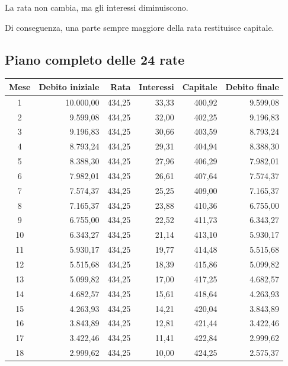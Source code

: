 \noindent La rata non cambia,
ma gli interessi diminuiscono.

\noindent Di conseguenza,
una parte sempre maggiore della rata
restituisce capitale.


\subsection*{Piano completo delle 24 rate}

\begin{center}
    \scriptsize
    \begin{tabular}{|c|r|r|r|r|r|}
        \hline
        \textbf{Mese}
        & \textbf{Debito iniziale}
        & \textbf{Rata}
        & \textbf{Interessi}
        & \textbf{Capitale}
        & \textbf{Debito finale} \\
        \hline
        1 & 10.000,00 & 434,25 & 33,33 & 400,92 & 9.599,08 \\
        2 & 9.599,08 & 434,25 & 32,00 & 402,25 & 9.196,83 \\
        3 & 9.196,83 & 434,25 & 30,66 & 403,59 & 8.793,24 \\
        4 & 8.793,24 & 434,25 & 29,31 & 404,94 & 8.388,30 \\
        5 & 8.388,30 & 434,25 & 27,96 & 406,29 & 7.982,01 \\
        6 & 7.982,01 & 434,25 & 26,61 & 407,64 & 7.574,37 \\
        7 & 7.574,37 & 434,25 & 25,25 & 409,00 & 7.165,37 \\
        8 & 7.165,37 & 434,25 & 23,88 & 410,36 & 6.755,00 \\
        9 & 6.755,00 & 434,25 & 22,52 & 411,73 & 6.343,27 \\
        10 & 6.343,27 & 434,25 & 21,14 & 413,10 & 5.930,17 \\
        11 & 5.930,17 & 434,25 & 19,77 & 414,48 & 5.515,68 \\
        12 & 5.515,68 & 434,25 & 18,39 & 415,86 & 5.099,82 \\
        13 & 5.099,82 & 434,25 & 17,00 & 417,25 & 4.682,57 \\
        14 & 4.682,57 & 434,25 & 15,61 & 418,64 & 4.263,93 \\
        15 & 4.263,93 & 434,25 & 14,21 & 420,04 & 3.843,89 \\
        16 & 3.843,89 & 434,25 & 12,81 & 421,44 & 3.422,46 \\
        17 & 3.422,46 & 434,25 & 11,41 & 422,84 & 2.999,62 \\
        18 & 2.999,62 & 434,25 & 10,00 & 424,25 & 2.575,37 \\

\end{tabular}
\end{center}
